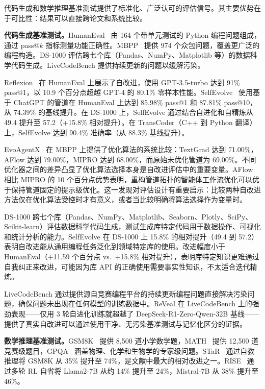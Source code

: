 代码生成和数学推理基准测试提供了标准化、广泛认可的评估信号。其主要优势在于可比性：结果可以直接跨论文和系统比较。

\textbf{代码生成基准测试。}HumanEval~\citep{chen2021humaneval} 由 164 个带单元测试的 Python 编程问题组成，通过 pass@$k$ 指标测量功能正确性。MBPP~\citep{austin2021mbpp} 提供 974 个众包问题，覆盖更广泛的编程构造。DS-1000 评估跨七个库（Pandas、NumPy、Matplotlib 等）的数据科学代码生成。LiveCodeBench 提供持续更新的问题以缓解污染。

Reflexion~\citep{reflexion2023} 在 HumanEval 上展示了自改进，使用 GPT-3.5-turbo 达到 91\% pass@1，以 10.9 个百分点超越 GPT-4 的 80.1\% 零样本性能。SelfEvolve~\citep{selfevolve2023} 使用基于 ChatGPT 的管道在 HumanEval 上达到 85.98\% pass@1 和 87.81\% pass@10，从 74.39\% 的基线提升。在 DS-1000 上，SelfEvolve 通过结合自进化和自精炼从 49.4 提升至 57.2（+15.8\% 相对提升）。在 TransCoder（C++ 到 Python 翻译）上，SelfEvolve 达到 90.4\% 准确率（从 88.3\% 基线提升）。

EvoAgentX~\citep{evoagentx2024} 在 MBPP 上提供了优化算法的系统比较：TextGrad 达到 71.00\%，AFlow 达到 79.00\%，MIPRO 达到 68.00\%，而原始未优化管道为 69.00\%。不同优化器之间的差异凸显了优化算法选择本身是自改进评估中的重要变量。AFlow 相比 MIPRO 的 10 个百分点优势表明，重构管道拓扑的智能体工作流优化可以优于保持管道固定的提示级优化。这一发现对评估设计有重要启示：比较两种自改进方法仅在优化算法受控时才有意义，或者当比较明确将算法选择作为变量时。

DS-1000 跨七个库（Pandas、NumPy、Matplotlib、Seaborn、Plotly、SciPy、Scikit-learn）评估数据科学代码生成，测试生成库特定代码用于数据操作、可视化和统计分析的能力。SelfEvolve 在 DS-1000 上 15.8\% 的相对提升（49.4 到 57.2）表明自改进能从通用编程任务泛化到领域特定库的使用。改进幅度小于 HumanEval（+11.59 个百分点 vs.\ +15.8\% 相对提升），表明库特定知识更难通过自我纠正来改进，可能因为库 API 的正确使用需要事实性知识，不太适合迭代精炼。

LiveCodeBench 通过提供源自竞赛编程平台的持续更新编程问题直接解决污染问题，确保问题未出现在任何模型的训练数据中。ReVeal 在 LiveCodeBench 上的强劲表现——仅用 3 轮自进化训练就超越了 DeepSeek-R1-Zero-Qwen-32B 基线——提供了真实自改进可以通过使用干净、无污染基准测试与记忆化区分的证据。

\textbf{数学推理基准测试。}GSM8K~\citep{cobbe2021gsm8k} 提供 8,500 道小学数学题，MATH~\citep{hendrycks2021math} 提供 12,500 道竞赛级题目，GPQA~\citep{rein2024gpqa} 涵盖物理、化学和生物学的专家级问题。STaR~\citep{star2022} 通过自教推理将 GSM8K 从 35\% 提升至 74\%，是文献中最大的相对改进之一。RISE~\citep{rise2024} 通过多轮 RL 自省将 Llama2-7B 从约 14\% 提升至 24\%，Mistral-7B 从 38\% 提升至 46\%。

